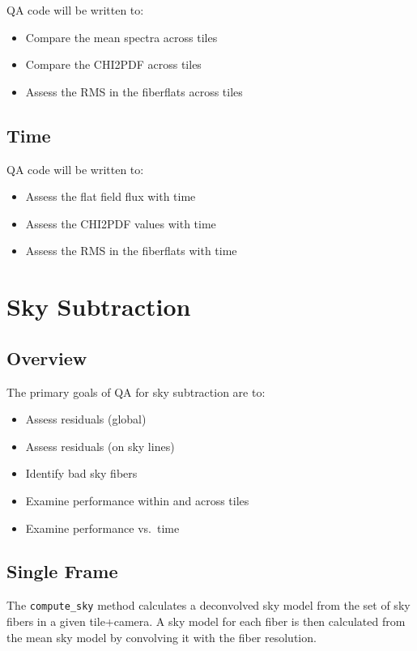 \documentclass[12pt]{article}
\newenvironment{myitemize}
{ \begin{itemize}
    \setlength{\itemsep}{0pt}
    \setlength{\parskip}{0pt}
    \setlength{\parsep}{0pt}     }
{ \end{itemize}                  }
\begin{document}
QA code will be written to:

\begin{myitemize}
\item Compare the mean spectra across tiles 
\item Compare the CHI2PDF across tiles
\item Assess the RMS in the fiberflats across tiles
\end{myitemize}

\subsection{Time}

QA code will be written to:

\begin{myitemize}
\item Assess the flat field flux with time
\item Assess the CHI2PDF values with time
\item Assess the RMS in the fiberflats with time
\end{myitemize}

\section{Sky Subtraction}

\subsection{Overview}

The primary goals of QA for sky subtraction are to:

\begin{myitemize}
\item Assess residuals (global)
\item Assess residuals (on sky lines)
\item Identify bad sky fibers
\item Examine performance within and across tiles
\item Examine performance vs.\ time
\end{myitemize}

\subsection{Single Frame}

The {\tt compute\_sky} method calculates a deconvolved sky model
from the set of sky fibers in a given tile+camera.  
A sky model for each fiber is then calculated from the 
mean sky model by convolving it with the fiber resolution.
\end{document}
